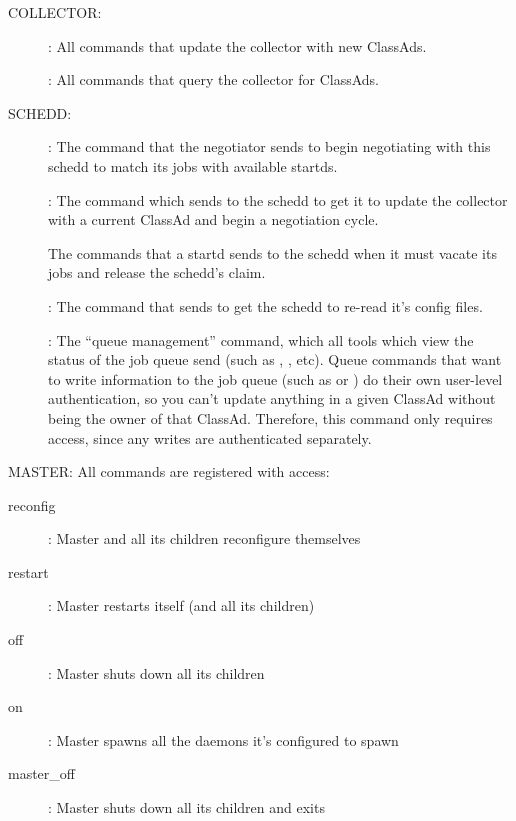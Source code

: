 COLLECTOR:

\begin{description}
\item[] : All commands that update the collector with
new ClassAds.

\item[] : All commands that query the collector for
ClassAds.
\end{description}

SCHEDD: 

\begin{description}
\item[] : The command that the negotiator sends to
  begin negotiating with this schedd to match its jobs with available
  startds.

\item[] : The command which  sends to
  the schedd to get it to update the collector with a current ClassAd
  and begin a negotiation cycle.

  The commands that a startd sends to the schedd when it must vacate
  its jobs and release the schedd's claim.

\item[] : The command that 
  sends to get the schedd to re-read it's config files.

\item[] : The ``queue management'' command, which all
  tools which view the status of the job queue send (such as
  , , etc).  Queue commands that want to
  write information to the job queue (such as  or
  ) do their own user-level authentication, so you can't
  update anything in a given ClassAd without being the owner of that
  ClassAd.  Therefore, this command only requires 
  access, since any writes are authenticated separately.
\end{description}

MASTER:  All commands are registered with 
access:

\begin{description}
\item[reconfig] : Master and all its children reconfigure themselves
\item[restart] : Master restarts itself (and all its children)	
\item[off] : Master shuts down all its children
\item[on] : Master spawns all the daemons it's configured to spawn
\item[master\_off] : Master shuts down all its children and exits
\end{description}


